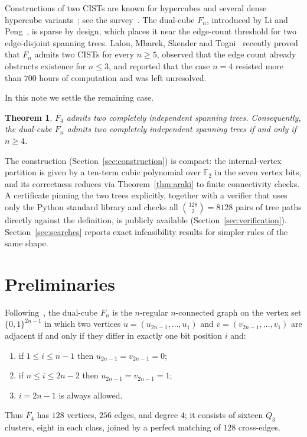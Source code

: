 \documentclass[10pt,a4paper]{amsart}
\newtheorem{theorem}{Theorem}
\begin{document}
Constructions of two CISTs are known for hypercubes and several dense
hypercube variants~\cite{PaiChang2016}; see the survey~\cite{ChengWangFan2023}.
The dual-cube $F_n$, introduced by Li and Peng~\cite{LiPeng2000}, is sparse
by design, which places it near the edge-count threshold for two
edge-disjoint spanning trees. Lalou, Mbarek, Skender and
Togni~\cite{Lalou2026} recently proved that $F_n$ admits two CISTs for
every $n\ge 5$, observed that the edge count already obstructs existence
for $n\le 3$, and reported that the case $n=4$ resisted more than $700$
hours of computation and was left unresolved.

In this note we settle the remaining case.

\begin{theorem}\label{thm:main}
$F_4$ admits two completely independent spanning trees. Consequently, the
dual-cube $F_n$ admits two completely independent spanning trees if and
only if $n\ge 4$.
\end{theorem}

The construction (Section~\ref{sec:construction}) is compact: the
internal-vertex partition is given by a ten-term cubic polynomial over
$\mathbb{F}_2$ in the seven vertex bits, and its correctness reduces via
Theorem~\ref{thm:araki} to finite connectivity checks. A certificate
pinning the two trees explicitly, together with a verifier that uses only
the Python standard library and checks all $\binom{128}{2}=8128$ pairs of
tree paths directly against the definition, is publicly available
(Section~\ref{sec:verification}). Section~\ref{sec:searches} reports exact
infeasibility results for simpler rules of the same shape.

\section{Preliminaries}\label{sec:prelim}

Following~\cite{Lalou2026}, the dual-cube $F_n$ is the $n$-regular
$n$-connected graph on the vertex set $\{0,1\}^{2n-1}$ in which two
vertices $u=(u_{2n-1},\dots,u_1)$ and $v=(v_{2n-1},\dots,v_1)$ are adjacent
if and only if they differ in exactly one bit position $i$ and:
\begin{enumerate}
\item if $1\le i\le n-1$ then $u_{2n-1}=v_{2n-1}=0$;
\item if $n\le i\le 2n-2$ then $u_{2n-1}=v_{2n-1}=1$;
\item $i=2n-1$ is always allowed.
\end{enumerate}
Thus $F_4$ has $128$ vertices, $256$ edges, and degree $4$; it consists of
sixteen $Q_3$ clusters, eight in each class, joined by a perfect matching
of $128$ cross-edges.
\end{document}
